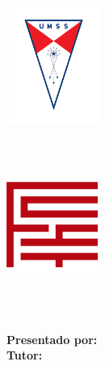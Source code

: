 \begin{titlepage}
    \begin{minipage}{2.7cm}
        \begin{center}
            \includegraphics[width=3.1cm,height=3.8cm]{img/umss.png}
        \end{center}
    \end{minipage}
    \hfill
    \begin{minipage}{11cm}
        \begin{center}
            \large{ \textbf{\MakeUppercase{\nombreUniversidad}} }\\
            \normalsize{ \textbf{\MakeUppercase{\nombreFacultad}} }\\
            \small{ \textbf{\MakeUppercase{\nombreCarrera}} }
        \end{center}
    \end{minipage}
    \hfill
    \begin{minipage}{3.0cm}
        \begin{center}
            \includegraphics[width=3cm,height=3cm]{img/fcyt.png}
        \end{center}
    \end{minipage}
    \vspace{5cm}\\
    \begin{center}
        \textbf{\MakeUppercase{\nombreProyecto}}
    \end{center}
    \vspace{4cm}
    \descripcion\\

    \vspace{2cm}
    \textnormal{\textbf{Presentado por:} \nombreAutor}\\

    \textnormal{\textbf{Tutor:} \nombreTutor}\\

    \vspace{2.5cm}
    \begin{center}
        \textbf{\MakeUppercase{\nombreCiudadPais}}\\
        \fecha
    \end{center}
\end{titlepage}
\restoregeometry